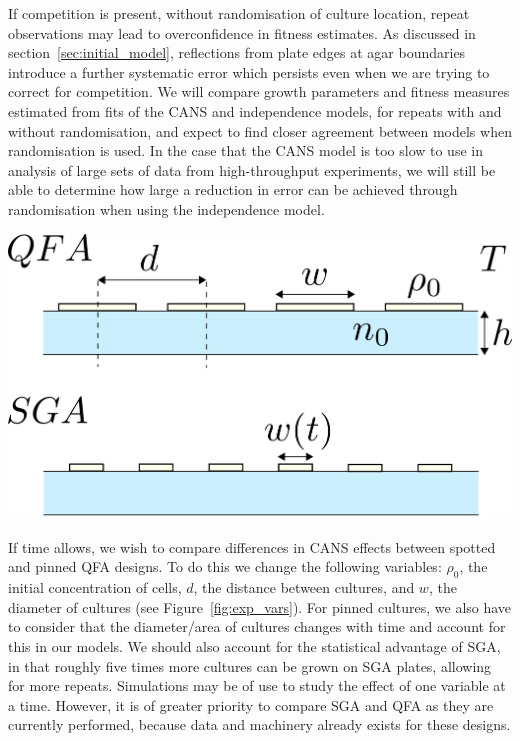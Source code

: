 If competition is present, without randomisation of culture location,
repeat observations may lead to overconfidence in fitness
estimates. As discussed in section~\ref{sec:initial_model},
reflections from plate edges at agar boundaries introduce a further
systematic error which persists even when we are trying to correct
for competition. We will compare growth parameters and fitness
measures estimated from fits of the CANS and independence models, for
repeats with and without randomisation, and expect to find closer
agreement between models when randomisation is used. In the case that
the CANS model is too slow to use in analysis of large sets of
data from high-throughput experiments, we will still be able to
determine how large a reduction in error can be achieved through
randomisation when using the independence model.

\begin{Figure}
  \centering
  \includegraphics[width=\linewidth]{qfa_v_sga_vars}
  \label{fig:exp_vars}
\end{Figure}

If time allows, we wish to compare differences in CANS effects between
spotted and pinned QFA designs. To do this we change the following
variables: \(\rho_{0}\), the initial concentration of cells, \(d\),
the distance between cultures, and \(w\), the diameter of cultures
(see Figure~\ref{fig:exp_vars}). For pinned cultures, we also have to
consider that the diameter/area of cultures changes with time and
account for this in our models. We should also account for the
statistical advantage of SGA, in that roughly five times more cultures
can be grown on SGA plates, allowing for more repeats. Simulations may
be of use to study the effect of one variable at a time. However, it
is of greater priority to compare SGA and QFA as they are currently
performed, because data and machinery already exists for these
designs.

